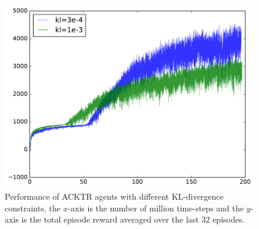 \begin{figure}[!htbp]
	\includegraphics[width=\textwidth]{images/rec_180612_mix.pdf}
	\centering
	\caption{Performance of ACKTR agents with different KL-divergence constraints, the $x$-axis is the number of million time-steps and the $y$-axis is the total episode reward averaged over the last 32 episodes.}\label{rec_mix}
\end{figure}
